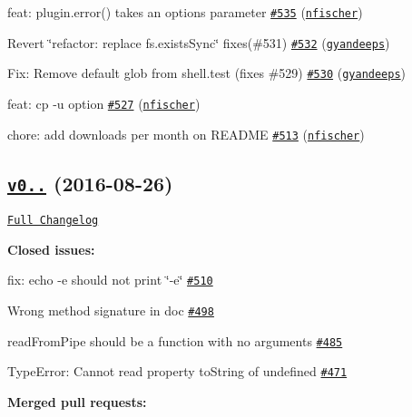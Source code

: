 \begin{DoxyItemize}
\item feat\+: plugin.\+error() takes an options parameter \href{https://github.com/shelljs/shelljs/pull/535}{\tt \#535} (\href{https://github.com/nfischer}{\tt nfischer})
\item Revert \char`\"{}refactor\+: replace fs.\+exists\+Sync\char`\"{} fixes(\#531) \href{https://github.com/shelljs/shelljs/pull/532}{\tt \#532} (\href{https://github.com/gyandeeps}{\tt gyandeeps})
\item Fix\+: Remove default glob from shell.\+test (fixes \#529) \href{https://github.com/shelljs/shelljs/pull/530}{\tt \#530} (\href{https://github.com/gyandeeps}{\tt gyandeeps})
\item feat\+: cp -\/u option \href{https://github.com/shelljs/shelljs/pull/527}{\tt \#527} (\href{https://github.com/nfischer}{\tt nfischer})
\item chore\+: add downloads per month on R\+E\+A\+D\+ME \href{https://github.com/shelljs/shelljs/pull/513}{\tt \#513} (\href{https://github.com/nfischer}{\tt nfischer})
\end{DoxyItemize}

\subsection*{\href{https://github.com/shelljs/shelljs/tree/v0.7.4}{\tt v0..} (2016-\/08-\/26)}

\href{https://github.com/shelljs/shelljs/compare/v0.7.3...v0.7.4}{\tt Full Changelog}

{\bfseries Closed issues\+:}


\begin{DoxyItemize}
\item fix\+: echo -\/e should not print \char`\"{}-\/e\char`\"{} \href{https://github.com/shelljs/shelljs/issues/510}{\tt \#510}
\item Wrong method signature in doc \href{https://github.com/shelljs/shelljs/issues/498}{\tt \#498}
\item read\+From\+Pipe should be a function with no arguments \href{https://github.com/shelljs/shelljs/issues/485}{\tt \#485}
\item Type\+Error\+: Cannot read property \textquotesingle{}to\+String\textquotesingle{} of undefined \href{https://github.com/shelljs/shelljs/issues/471}{\tt \#471}
\end{DoxyItemize}

{\bfseries Merged pull requests\+:}


